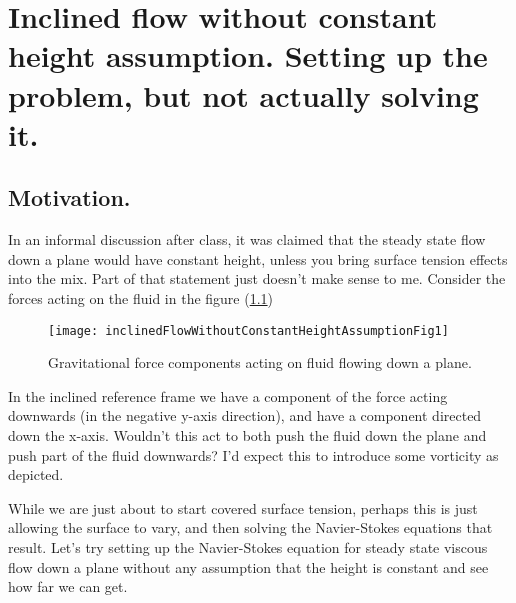 %
%

\chapter{Inclined flow without constant height assumption.  Setting up the problem, but not actually solving it.}
\label{chap:inclinedFlowWithoutConstantHeightAssumption}
{}
\date{Mar 6, 2012}

\beginArtWithToc

\section{Motivation.}

In an informal discussion after class, it was claimed that the steady state flow down a plane would have constant height, unless you bring surface tension effects into the mix.  Part of that statement just doesn't make sense to me.  Consider the forces acting on the fluid in the figure (\ref{fig:inclinedFlowWithoutConstantHeightAssumption:inclinedFlowWithoutConstantHeightAssumptionFig1})

\begin{figure}[htp]
   \centering
   \texttt{[image: inclinedFlowWithoutConstantHeightAssumptionFig1]}
\caption{Gravitational force components acting on fluid flowing down a plane.}
\label{fig:inclinedFlowWithoutConstantHeightAssumption:inclinedFlowWithoutConstantHeightAssumptionFig1}
\end{figure}

In the inclined reference frame we have a component of the force acting downwards (in the negative y-axis direction), and have a component directed down the x-axis.  Wouldn't this act to both push the fluid down the plane and push part of the fluid downwards?  I'd expect this to introduce some vorticity as depicted.

While we are just about to start covered surface tension, perhaps this is just allowing the surface to vary, and then solving the Navier-Stokes equations that result.  Let's try setting up the Navier-Stokes equation for steady state viscous flow down a plane without any assumption that the height is constant and see how far we can get.

